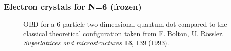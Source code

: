 \begin{frame}
\frametitle{Electron crystals for N=6 (frozen)}
 \begin{figure}
 \begin{center}
  \label{fig:wigner20}
  \caption{OBD for a 6-particle two-dimensional quantum dot compared to the classical theoretical configuration taken from F. Bolton, U. Rössler.  \textit{Superlattices and microstructures} \textbf{13}, 139 (1993).}
 \end{center}
\end{figure}
\end{frame}

